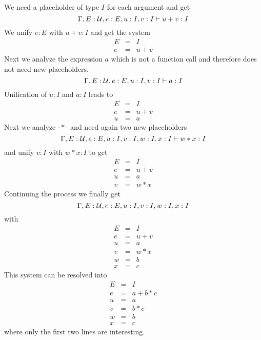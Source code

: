 We need a placeholder of type $I$ for each argument and get
$$
%
\Gamma,  E: \Any, e: E, u:I, v:I \vdash u + v: I
$$
%
We unify $e:E$ with $u+v:I$ and get the system
$$
%
\begin{array}{lll}
  E &=& I
  \\
  e &=& u + v
\end{array}
$$
%
Next we analyze the expression $a$ which is not a function call and therefore
does not need new placeholders.
$$
%
\Gamma,  E: \Any, e: E, u:I, v:I \vdash a:I
$$
%
Unification of $u:I$ and $a:I$ leads to
$$
%
\begin{array}{lll}
  E &=& I
  \\
  e &=& u + v
  \\
  u &=& a
\end{array}
$$
%
Next we analyze $\cdot * \cdot$ and need again two new placeholders
$$
%
\Gamma,  E: \Any, e: E, u:I, v:I, w:I, x:I \vdash w * x: I
$$
%
and unify $v:I$ with $ w * x: I$ to get
$$
%
\begin{array}{lll}
  E &=& I
  \\
  e &=& u + v
  \\
  u &=& a
  \\
  v &=& w * x
\end{array}
$$
%
Continuing the process we finally get
$$
%
\Gamma,  E: \Any, e: E, u:I, v:I, w:I, x:I
$$
%
with
$$
%
\begin{array}{lll}
  E &=& I
  \\
  e &=& u + v
  \\
  u &=& a
  \\
  v &=& w * x
  \\
  w &=& b
  \\
  x &=& c
\end{array}
$$
%
This system can be resolved into
$$
%
\begin{array}{lll}
  E &=& I
  \\
  e &=& a + b * c
  \\
  u &=& a
  \\
  v &=& b * c
  \\
  w &=& b
  \\
  x &=& c
\end{array}
$$
%
where only the first two lines are interesting.





